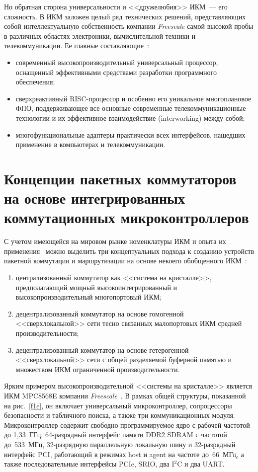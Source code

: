 \begin{multicols}{2}
     Но обратная сторона универсальности и <<дружелюбия>> ИКМ~--- его сложность. В 
ИКМ заложен целый ряд технических решений, представляющих собой интеллектуальную 
собственность компании \textit{Freescale} самой высокой пробы в различных областях 
электроники, вычислительной техники и телекоммуникации. Ее главные 
составляющие~\cite{8e}:
     \begin{itemize}
\item современный высокопроизводительный универсальный процессор, оснащенный 
эффективными средствами разработки программного обеспечения;
\item сверхреактивный RISC-процессор и особенно его уникальное многоплановое ФПО, 
поддерживающее все основные современные телекоммуникационные технологии и их 
эффективное взаимодействие (interworking) между собой;

\item многофункциональные адаптеры практически всех интерфейсов, нашедших 
применение в компьютерах и телекоммуникации.
\end{itemize}

\section{Концепции пакетных коммутаторов на основе интегрированных коммутационных
 микроконтроллеров}
     
     С учетом имеющейся на мировом рынке номенклатуры ИКМ и опыта их 
применения~\cite{3e, 6e} можно выделить три концептуальных подхода к созданию 
устройств пакетной коммутации и маршрутизации на основе некоего обобщенного 
ИКМ~\cite{1e, 2e}:
     \begin{enumerate}[(1)]
\item централизованный коммутатор как <<система на кристалле>>, предполагающий 
мощный высокоинтегрированный и высокопроизводительный многопортовый ИКМ;
\item децентрализованный коммутатор на основе гомогенной <<сверхлокальной>> сети 
тесно связанных малопортовых ИКМ средней производительности;

\item децентрализованный коммутатор на основе гетерогенной <<сверхлокальной>> сети с 
общей разделяемой буферной памятью и множеством ИКМ ограниченной 
производительности.
\end{enumerate}

     Ярким примером высокопроизводительной <<системы на кристалле>> является ИКМ 
MPC8568E компании \textit{Freescale}~\cite{11e}. В рамках общей структуры, показанной на 
рис.~\ref{f1e}, он включает универсальный микроконтроллер, сопроцессоры безопас\-ности и 
табличного поиска, а также три коммуникационных модуля. Микроконтроллер содержит 
свободно программируемое ядро с рабочей частотой до 1,33~ГГц, 64-раз\-ряд\-ный интерфейс 
памяти DDR2 SDRAM с частотой до~533~МГц, 32-раз\-ряд\-ную параллельную локальную 
шину и 32-раз\-ряд\-ный интерфейс PCI, работающий в режимах host и agent на частоте до~66~МГц, 
а также последовательные интерфейсы PCIe, SRIO, два I$^2$C и два UART.
     

\end{multicols}

